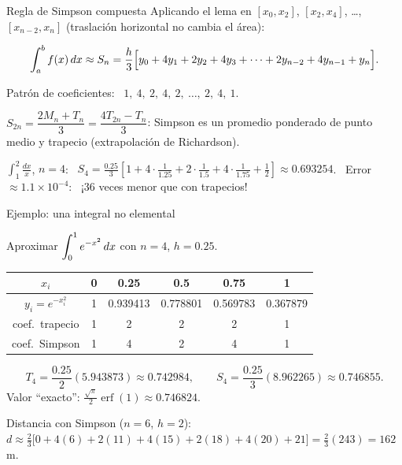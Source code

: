 \documentclass[10pt,aspectratio=169]{beamer}
\begin{document}
\begin{frame}{Regla de Simpson compuesta}
  Aplicando el lema en $[x_0,x_2]$, $[x_2,x_4]$, \dots, $[x_{n-2},x_n]$ (traslación horizontal no cambia el área):
  \begin{teorema}
    \[ \int_a^bf(x)\,dx\approx S_n=\frac h3\Big[y_0+4y_1+2y_2+4y_3+\dots+2y_{n-2}+4y_{n-1}+y_n\Big]. \]
  \end{teorema}
  Patrón de coeficientes: \ $1,\ 4,\ 2,\ 4,\ 2,\ \dots,\ 2,\ 4,\ 1$.
  \begin{observacion}
    $S_{2n}=\dfrac{2M_n+T_n}{3}=\dfrac{4T_{2n}-T_n}{3}$: Simpson es un promedio ponderado de punto medio y trapecio
    (extrapolación de Richardson).
  \end{observacion}
  \begin{ejemplo}[3]
    $\displaystyle\int_1^2\frac{dx}{x}$, $n=4$: \
    $S_4=\frac{0.25}{3}\left[1+4\cdot\tfrac{1}{1.25}+2\cdot\tfrac{1}{1.5}+4\cdot\tfrac1{1.75}+\tfrac12\right]\approx0.693254$.
    \ Error $\approx1.1\times10^{-4}$: \ ¡36 veces menor que con trapecios!
  \end{ejemplo}
\end{frame}

\begin{frame}{Ejemplo: una integral no elemental}
  \begin{ejemplo}[4]
    Aproximar $\displaystyle\int_0^1e^{-x^2}\,dx$ con $n=4$, $h=0.25$.
    \begin{center}
      \begin{tabular}{c|ccccc}
        $x_i$ & 0 & 0.25 & 0.5 & 0.75 & 1\\ \hline
        $y_i=e^{-x_i^2}$ & 1 & 0.939413 & 0.778801 & 0.569783 & 0.367879\\
        coef.\ trapecio & 1 & 2 & 2 & 2 & 1\\
        coef.\ Simpson & 1 & 4 & 2 & 4 & 1
      \end{tabular}
    \end{center}
    \[ T_4=\frac{0.25}{2}(5.943873)\approx0.742984,\qquad S_4=\frac{0.25}{3}(8.962265)\approx0.746855. \]
    Valor ``exacto'': $\frac{\sqrt\pi}{2}\operatorname{erf}(1)\approx0.746824$.
  \end{ejemplo}
  \vspace{-1mm}
  \begin{ejemplo}[5: datos]
    Distancia con Simpson ($n=6$, $h=2$):
    $d\approx\frac23\big[0+4(6)+2(11)+4(15)+2(18)+4(20)+21\big]=\frac23(243)=162$ m.
  \end{ejemplo}
\end{frame}
\end{document}
